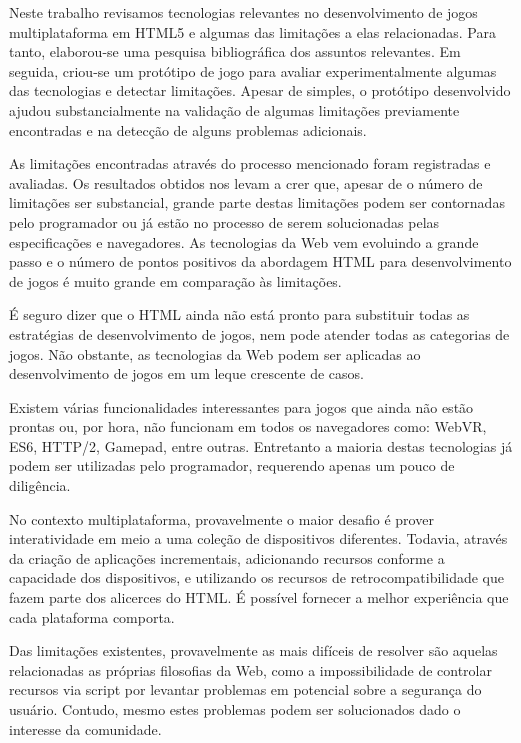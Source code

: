 Neste trabalho revisamos tecnologias relevantes no desenvolvimento
de jogos multiplataforma em HTML5 e algumas das limitações a elas
relacionadas. Para tanto, elaborou-se uma pesquisa bibliográfica
dos assuntos relevantes. Em seguida, criou-se um protótipo de jogo
para avaliar experimentalmente algumas das tecnologias e detectar
limitações. Apesar de simples, o protótipo desenvolvido ajudou
substancialmente na validação de algumas limitações previamente
encontradas e na detecção de alguns problemas adicionais.

As limitações encontradas através do processo mencionado foram
registradas e avaliadas. Os resultados obtidos nos levam a crer que,
apesar de o número de limitações ser substancial, grande parte 
destas limitações podem ser contornadas pelo programador ou já estão
no processo de serem solucionadas pelas especificações e navegadores.
As tecnologias da Web vem evoluindo a grande passo e o número de pontos
positivos da abordagem HTML para desenvolvimento de jogos é muito
grande em comparação às limitações.

É seguro dizer que o HTML ainda não está pronto para substituir todas
as estratégias de desenvolvimento de jogos, nem pode atender todas as
categorias de jogos. Não obstante, as tecnologias da Web podem ser
aplicadas ao desenvolvimento de jogos em um leque crescente de casos.

Existem várias funcionalidades interessantes para jogos que ainda não
estão prontas ou, por hora, não funcionam em todos os navegadores
como: WebVR, ES6, HTTP/2, Gamepad, entre outras. Entretanto a maioria
destas tecnologias já podem ser utilizadas pelo programador, requerendo
apenas um pouco de diligência.

No contexto multiplataforma, provavelmente o maior desafio é prover
interatividade em meio a uma coleção de dispositivos diferentes.
Todavia, através da criação de aplicações incrementais,
adicionando recursos conforme a capacidade dos dispositivos, e
utilizando os recursos de retrocompatibilidade que fazem parte dos
alicerces do HTML. É possível fornecer a melhor experiência que cada
plataforma comporta.

Das limitações existentes, provavelmente as mais difíceis de resolver
são aquelas relacionadas as próprias filosofias da Web, como a
impossibilidade de controlar recursos via script por levantar problemas
em potencial sobre a segurança do usuário. Contudo, mesmo estes problemas
podem ser solucionados dado o interesse da comunidade.

